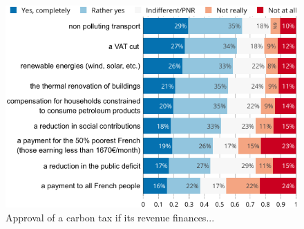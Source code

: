 \documentclass[english,5p,authoryear]{elsarticle}
\begin{document}


\begin{figure}[!htbp]
\centering
\includegraphics[width=\columnwidth]{Images/tax_condition_valc.png}
\caption{Approval of a carbon tax if its revenue finances...}
\label{fig:recycling}
\end{figure}
\end{document}
